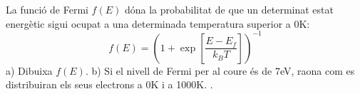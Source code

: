 \begin{exr}{}
La funció de Fermi $f(E)$ dóna la probabilitat de que un determinat estat energètic sigui ocupat a una determinada temperatura superior a 0K:
\[f(E)=\left( 1 + \exp \left[ \frac{E-E_f}{k_B T} \right] \right)^{-1}\]
a) Dibuixa $f(E)$. b) Si el nivell de Fermi per al coure és de 7eV, raona com es distribuiran els seus electrons a 0K i a 1000K.
\label{Ex:Fermi}.
\end{exr}
